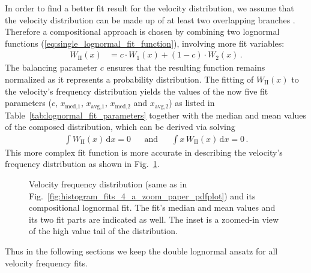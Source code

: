 \documentclass[]{aa}
\begin{document}
	In order to find a better fit result for the velocity distribution, we assume that the velocity distribution can be made up of at least two overlapping branches \citep{McGregor2011b}. Therefore a compositional approach  is chosen by combining two lognormal functions (\ref{eq:single_lognormal_fit_function}), involving more fit variables:
	\begin{align}
		W_\text{II}(x) &= c \cdot W_1(x) + (1 -c) \cdot W_2(x)\,.	\label{eq:double_lognormal_fit_function}
	\end{align}
	The balancing parameter $c$ ensures that the resulting function remains normalized as it represents a probability distribution.
	The fitting of $W_\text{II}(x)$ to the velocity's frequency distribution yields the values of the now five fit parameters ($c$, $x_\text{med,1}$, $x_\text{avg,1}$, $x_\text{med,2}$ and $x_\text{avg,2}$) as listed in Table~\ref{tab:lognormal_fit_parameters} together with the median and mean values of the composed distribution, which can be derived via solving
	\begin{align}
		\int W_\text{II}(x)\,\text{d}x = 0	&	&\text{and}	&	&\int x\,W_\text{II}(x)\,\text{d}x = 0	\,.
	\end{align}
	This more complex fit function is more accurate in describing the velocity's frequency distribution as shown in Fig.~\ref{fig:histogram_fits_V_a_zoom_dbl_paper_pdfplot}.
	\begin{figure}
		\caption{Velocity frequency distribution (same as in Fig.~\ref{fig:histogram_fits_4_a_zoom_paper_pdfplot}) and its compositional lognormal fit. The fit's median and mean values and its two fit parts are indicated as well. The inset is a zoomed-in view of the high value tail of the distribution.}
		\label{fig:histogram_fits_V_a_zoom_dbl_paper_pdfplot}
	\end{figure}
	Thus in the following sections we keep the double lognormal ansatz for all velocity frequency fits.
\end{document}
